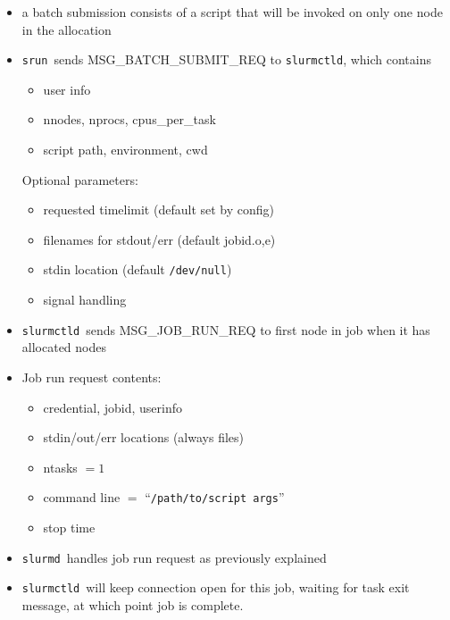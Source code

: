 \documentclass[article,letter,landscape]{seminar}
\newcommand{\slurmd}{{\tt slurmd}}
\newcommand{\slurmctld}{{\tt slurmctld}}
\newcommand{\srun}{{\tt srun}}
\begin{document}
\begin{slide}
  \begin{center}
  \begin{itemize}
    \item a batch submission consists of a script that will be invoked
          on only one node in the allocation 
    \item \srun\ sends MSG\_BATCH\_SUBMIT\_REQ to \slurmctld , which contains
    \begin{itemize}
      \item user info
      \item nnodes, nprocs, cpus\_per\_task
      \item script path, environment, cwd
    \end{itemize}
    Optional parameters:
    \begin{itemize}
      \item requested timelimit (default set by config)
      \item filenames for stdout/err (default jobid.o,e)
      \item stdin location (default {\tt /dev/null})
      \item signal handling
    \end{itemize}
  \end{itemize}
  \end{center}
\end{slide}

\begin{slide}
  \begin{center}
  \begin{itemize}
    \item \slurmctld\ sends MSG\_JOB\_RUN\_REQ to first node in job
          when it has allocated nodes
    \item Job run request contents:
    \begin{itemize}
      \item credential, jobid, userinfo
      \item stdin/out/err locations (always files)
      \item ntasks $=1$
      \item command line $=$ ``{\tt /path/to/script args}''
      \item stop time
    \end{itemize}
  \item \slurmd\ handles job run request as previously explained
  \item \slurmctld\ will keep connection open for this job, waiting
        for task exit message, at which point job is complete.
  \end{itemize}
  \end{center}
\end{slide}
\end{document}
